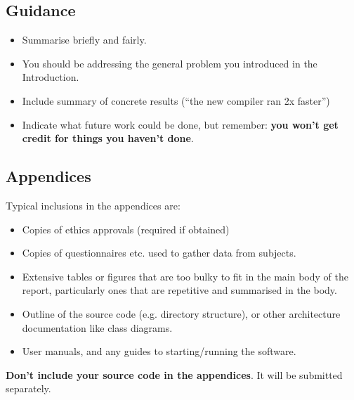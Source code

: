 \documentclass{l4proj}
\theoremstyle{definition}
\begin{document}
\section{Guidance}
\begin{itemize}
    \item
        Summarise briefly and fairly.
    \item
        You should be addressing the general problem you introduced in the
        Introduction.        
    \item
        Include summary of concrete results (``the new compiler ran 2x
        faster'')
    \item
        Indicate what future work could be done, but remember: \textbf{you
        won't get credit for things you haven't done}.
\end{itemize}

%
% 

\begin{appendices}

\chapter{Appendices}

Typical inclusions in the appendices are:

\begin{itemize}
\item
  Copies of ethics approvals (required if obtained)
\item
  Copies of questionnaires etc. used to gather data from subjects.
\item
  Extensive tables or figures that are too bulky to fit in the main body of
  the report, particularly ones that are repetitive and summarised in the body.

\item Outline of the source code (e.g. directory structure), or other architecture documentation like class diagrams.

\item User manuals, and any guides to starting/running the software.

\end{itemize}

\textbf{Don't include your source code in the appendices}. It will be
submitted separately.

\end{appendices}






\end{document}
